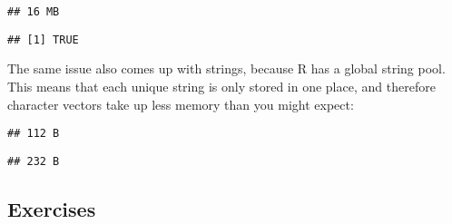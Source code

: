 \begin{Shaded}
\begin{Highlighting}[]
\end{Highlighting}
\end{Shaded}

\begin{verbatim}
## 16 MB
\end{verbatim}

\begin{Shaded}
\begin{Highlighting}[]
\OperatorTok{+}\StringTok{ }\OperatorTok{==}\StringTok{ }
\end{Highlighting}
\end{Shaded}

\begin{verbatim}
## [1] TRUE
\end{verbatim}

The same issue also comes up with strings, because R has a global string
pool. This means that each unique string is only stored in one place,
and therefore character vectors take up less memory than you might
expect: 

\begin{Shaded}
\begin{Highlighting}[]
\NormalTok{(}\NormalTok{)}
\end{Highlighting}
\end{Shaded}

\begin{verbatim}
## 112 B
\end{verbatim}

\begin{Shaded}
\begin{Highlighting}[]
\NormalTok{(}\NormalTok{(}\NormalTok{, }\NormalTok{))}
\end{Highlighting}
\end{Shaded}

\begin{verbatim}
## 232 B
\end{verbatim}

\hypertarget{exercises}{%
\subsection{Exercises}\label{exercises}}

